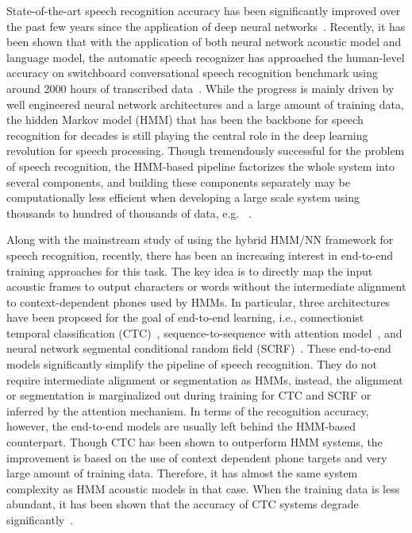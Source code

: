 \documentclass[a4paper]{article}
\begin{document}
State-of-the-art speech recognition accuracy has been significantly improved over the past few years since the application of deep neural networks~\cite{hinton2012deep, seide2011conversational}. Recently, it has been shown that with the application of both neural network acoustic model and language model, the automatic speech recognizer has approached the human-level accuracy on switchboard conversational speech recognition benchmark using around 2000 hours of transcribed data~\cite{xiong2016}. While the progress is mainly driven by well engineered neural network architectures and a large amount of training data, the hidden Markov model (HMM) that has been the backbone for speech recognition for decades is still playing the central role in the deep learning revolution for speech processing. Though tremendously successful for the problem of speech recognition, the HMM-based pipeline factorizes the whole system into several components, and building these components separately may be computationally less efficient when developing a large scale system using thousands to hundred of thousands of data, e.g. ~\cite{soltau2016neural}.

Along with the mainstream study of using the hybrid HMM/NN framework for speech recognition, recently, there has been an increasing interest in end-to-end training approaches for this task. The key idea is to directly map the input acoustic frames to output characters or words without the intermediate alignment to context-dependent phones used by HMMs. In particular, three architectures have been proposed for the goal of end-to-end learning, i.e., connectionist temporal classification (CTC)~\cite{graves2014towards, Hannun2014Deep, sak2015learning, miao2015eesen}, sequence-to-sequence with attention model~\cite{chorowski2015attention, lu2015study, chan2016listen}, and neural network segmental conditional random field (SCRF)~\cite{abdel2013deep, lu2016segmental}. These end-to-end models significantly simplify the pipeline of speech recognition. They do not require intermediate alignment or segmentation as HMMs, instead, the alignment or segmentation is marginalized out during training for CTC and SCRF or inferred by the attention mechanism. In terms of the recognition accuracy, however, the end-to-end models are usually left behind the HMM-based counterpart. Though CTC has been shown to outperform HMM systems\cite{sak2015fast}, the improvement is based on the use of context dependent phone targets and very large amount of training data. Therefore, it has almost the same system complexity as HMM acoustic models in that case. When the training data is less abundant, it has been shown that the accuracy of CTC systems degrade significantly~\cite{pundak2016lower}. 
\end{document}

